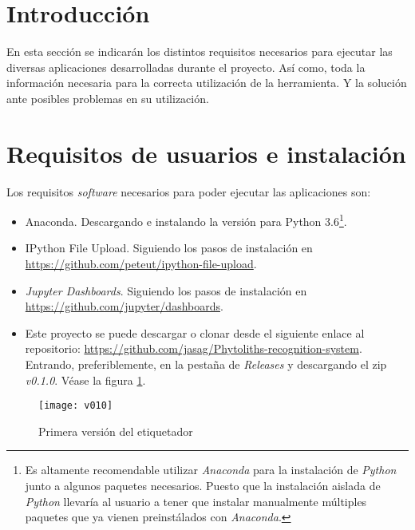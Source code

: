
\section{Introducción}

En esta sección se indicarán los distintos requisitos necesarios para ejecutar las diversas aplicaciones desarrolladas durante el proyecto. Así como, toda la información necesaria para la correcta utilización de la herramienta. Y la solución ante posibles problemas en su utilización.

\section{Requisitos de usuarios e instalación}

Los requisitos \textit{software} necesarios para poder ejecutar las aplicaciones son:

\begin{itemize}
	\item Anaconda. Descargando e instalando la versión para Python 3.6\footnote{Es altamente recomendable utilizar \textit{Anaconda} para la instalación de \textit{Python} junto a algunos paquetes necesarios. Puesto que la instalación aislada de \textit{Python} llevaría al usuario a tener que instalar manualmente múltiples paquetes que ya vienen preinstálados con \textit{Anaconda}.}.

	\item IPython File Upload. Siguiendo los pasos de instalación en \url{https://github.com/peteut/ipython-file-upload}.

	\item \textit{Jupyter Dashboards}. Siguiendo los pasos de instalación en \url{https://github.com/jupyter/dashboards}.

	\item Este proyecto se puede descargar o clonar desde el siguiente enlace al repositorio: \url{https://github.com/jasag/Phytoliths-recognition-system}. Entrando, preferiblemente, en la pestaña de \textit{Releases} y descargando el zip \textit{v0.1.0}. Véase la figura \ref{fig:E.4.0}.

\end{itemize}

\begin{figure}[h]
\centering
\texttt{[image: v010]}
\caption{Primera versión del etiquetador}
\label{fig:E.4.0}
\end{figure}

